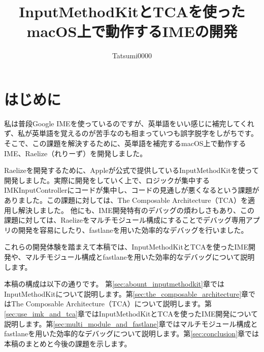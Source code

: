 \documentclass[uplatex,a4j,12pt]{jsarticle}
\begin{document}
\title{\vspace{-10mm}InputMethodKitとTCAを使ったmacOS上で動作するIMEの開発}
\author{Tatsumi0000}
\date{}
\maketitle


\section{はじめに}\label{sec:intro}
私は普段Google IMEを使っているのですが、英単語をいい感じに補完してくれず、私が英単語を覚えるのが苦手なのも相まっていつも誤字脱字をしがちです。そこで、この課題を解決するために、英単語を補完するmacOS上で動作するIME、Raelize（れりーず）を開発しました。

Raelizeを開発するために、Appleが公式で提供しているInputMethodKit\cite{bib:about_inputmethodkit}を使って開発しました。実際に開発をしていく上で、ロジックが集中するIMKInputControllerにコードが集中し、コードの見通しが悪くなるという課題がありました。この課題に対しては、The Composable Architecture（TCA）\cite{bib:the_composable_architecture}を適用し解決しました。
他にも、IME開発特有のデバッグの煩わしさもあり、この課題に対しては、Raelizeをマルチモジュール構成にすることでデバッグ専用アプリの開発を容易にしたり、fastlane\cite{bib:fastlane}を用いた効率的なデバッグを行いました。

これらの開発体験を踏まえて本稿では、InputMethodKitとTCAを使ったIME開発や、マルチモジュール構成とfastlaneを用いた効率的なデバッグについて説明します。

本稿の構成は以下の通りです。
第\ref{sec:abount_inputmethodkit}章ではInputMethodKitについて説明します。第\ref{sec:the_composable_architecture}章ではThe Composable Architecture（TCA）について説明します。第\ref{sec:use_imk_and_tca}章ではInputMethodKitとTCAを使ったIME開発について説明します。第\ref{sec:multi_module_and_fastlane}章ではマルチモジュール構成とfastlaneを用いた効率的なデバッグについて説明します。第\ref{sec:conclusion}章では本稿のまとめと今後の課題を示します。

\end{document}
